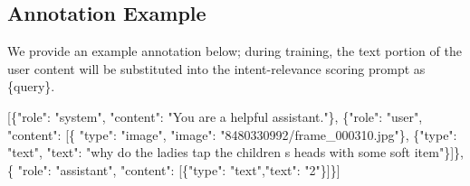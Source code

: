 \documentclass[11pt]{article}
\begin{document}
\subsection{Annotation Example}
We provide an example annotation below; during training, the text portion of the user content will be substituted into the intent-relevance scoring prompt as \{query\}.
\begin{tcolorbox}[
  fonttitle = \small\bfseries,
  title=Annotation Example,
  colframe=gray!2!black,
  colback=gray!2!white,
  boxrule=1pt,
  boxsep=0pt,
  left=5pt,
  right=5pt,
  fontupper=\setlength{\parskip}{6pt}\footnotesize, %
  halign title = flush center,
]

[\{"role": "system", "content": "You are a helpful assistant."\}, \{"role": "user", "content": [\{ "type": "image", "image": "8480330992/frame\_000310.jpg"\}, \{"type": "text", "text": "why do the ladies tap the children s heads with some soft item"\}]\}, \{ "role": "assistant", "content": [\{"type": "text","text": "2"\}]\}]

\end{tcolorbox}

\end{document}
